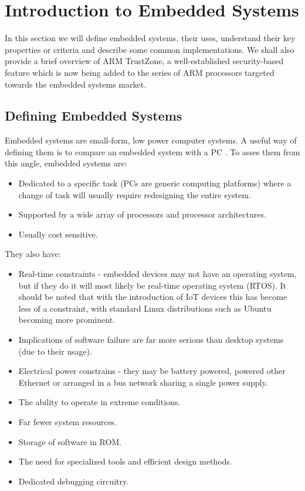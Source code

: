 \section{Introduction to Embedded Systems}

In this section we will define embedded systems, their uses, understand their key properties or criteria and describe some common implementations. We shall also provide a brief overview of ARM TrustZone, a well-established security-based feature which is now being added to the series of ARM processors targeted towards the embedded systems market.

\subsection{Defining Embedded Systems}

Embedded systems are small-form, low power computer systems. A useful way of defining them is to compare an embedded system with a PC \cite{BergerArnold2002Esd:}. To asses them from this angle, embedded systems are:
\begin{itemize}
\item Dedicated to a specific task (PCs are generic computing platforms) where a change of task will usually require redesigning the entire system.
\item Supported by a wide array of processors and processor architectures.
\item Usually cost sensitive.
\end{itemize}
They also have:
\begin{itemize}
\item Real-time constraints - embedded devices may not have an operating system, but if they do it will most likely be real-time operating system (RTOS). It should be noted that with the introduction of IoT devices this has become less of a constraint, with standard Linux distributions such as Ubuntu becoming more prominent.
\item Implications of software failure are far more serious than desktop systems (due to their usage).
\item Electrical power constrains - they may be battery powered, powered other Ethernet or arranged in a bus network sharing a single power supply.
\item The ability to operate in extreme conditions.
\item Far fewer system resources.
\item Storage of software in ROM.
\item The need for specialized tools and efficient design methods.
\item Dedicated debugging circuitry.
\end{itemize}

